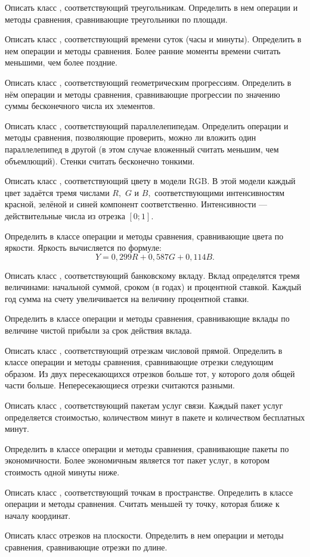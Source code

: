 \task Описать класс , соответствующий треугольникам.
Определить в нем операции и методы сравнения, сравнивающие
треугольники по площади.

\task Описать класс , соответствующий времени суток (часы и
минуты). Определить в нем операции и методы сравнения. Более ранние
моменты времени считать меньшими, чем более поздние.

\task Описать класс , соответствующий геометрическим
прогрессиям. Определить в нём операции и методы сравнения,
сравнивающие прогрессии по значению суммы бесконечного числа их
элементов.

\task Описать класс , соответствующий
параллелепипедам. Определить операции и методы сравнения, позволяющие
проверить, можно ли вложить один параллелепипед в другой (в этом
случае вложенный считать меньшим, чем объемлющий). Стенки считать
бесконечно тонкими.

\task Описать класс , соответствующий цвету в модели
RGB. В этой модели каждый цвет задаётся тремя числами $R,$ $G$ и $B,$
соответствующими интенсивностям красной, зелёной и синей компонент
соответственно. Интенсивности — действительные числа из отрезка
$[0; 1]$.

Определить в классе операции и методы сравнения, сравнивающие цвета по
яркости. Яркость вычисляется по формуле:
\[
Y = 0{,}299 R + 0{,}587 G + 0{,}114 B.
\]

\task Описать класс , соответствующий банковскому
вкладу. Вклад определятся тремя величинами: начальной суммой, сроком
(в годах) и процентной ставкой. Каждый год сумма на счету
увеличивается на величину процентной ставки.

Определить в классе операции и методы сравнения, сравнивающие вклады
по величине чистой прибыли за срок действия вклада.

\task Описать класс , соответствующий отрезкам числовой
прямой. Определить в классе операции и методы сравнения, сравнивающие
отрезки следующим образом. Из двух пересекающихся отрезков больше тот,
у которого доля общей части больше. Непересекающиеся отрезки считаются
разными.

\task Описать класс , соответствующий пакетам услуг
связи. Каждый пакет услуг определяется стоимостью, количеством минут в
пакете и количеством бесплатных минут.

Определить в классе операции и методы сравнения, сравнивающие пакеты
по экономичности. Более экономичным является тот пакет услуг, в
котором стоимость одной минуты ниже.

\task Описать класс , соответствующий точкам в
пространстве.  Определить в классе операции и методы
сравнения. Считать меньшей ту точку, которая ближе к началу координат.

\task Описать класс  отрезков на плоскости. Определить в нем
операции и методы сравнения, сравнивающие отрезки по длине.
